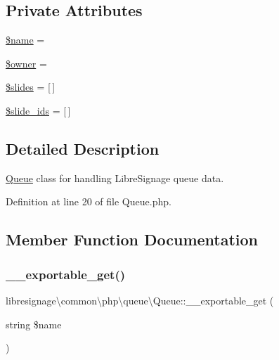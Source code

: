 \subsection*{Private Attributes}
\begin{DoxyCompactItemize}
\item 
\hyperlink{classlibresignage_1_1common_1_1php_1_1queue_1_1Queue_af2fdf47ced0830867eee190897b1d0d2}{\$name} = \textquotesingle{}\textquotesingle{}
\item 
\hyperlink{classlibresignage_1_1common_1_1php_1_1queue_1_1Queue_a90a3434c08023925924b7c12653a8d81}{\$owner} = \textquotesingle{}\textquotesingle{}
\item 
\hyperlink{classlibresignage_1_1common_1_1php_1_1queue_1_1Queue_aaaff950a4d8456ae5d21266c7c33931d}{\$slides} = \mbox{[}$\,$\mbox{]}
\item 
\hyperlink{classlibresignage_1_1common_1_1php_1_1queue_1_1Queue_a8ad15f0ffc74a017551679ee0791b8f1}{\$slide\+\_\+ids} = \mbox{[}$\,$\mbox{]}
\end{DoxyCompactItemize}


\subsection{Detailed Description}
\hyperlink{classlibresignage_1_1common_1_1php_1_1queue_1_1Queue}{Queue} class for handling Libre\+Signage queue data. 

Definition at line 20 of file Queue.\+php.



\subsection{Member Function Documentation}
\mbox{\label{classlibresignage_1_1common_1_1php_1_1queue_1_1Queue_a0ccc4ced8e0c340b9d6dd144f5846478}} 
\subsubsection{\texorpdfstring{\+\_\+\+\_\+exportable\+\_\+get()}{\_\_exportable\_get()}}
{\footnotesize\ttfamily libresignage\textbackslash{}common\textbackslash{}php\textbackslash{}queue\textbackslash{}\+Queue\+::\+\_\+\+\_\+exportable\+\_\+get (\begin{DoxyParamCaption}\item[{string}]{\$name }\end{DoxyParamCaption})}



